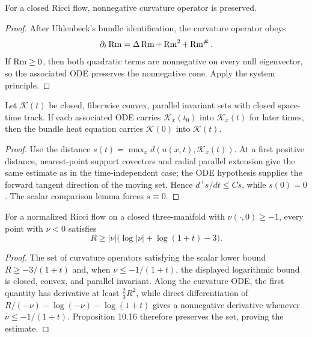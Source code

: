 \begin{theorem}
\label{thm:chow-ii-curvature-operator-preservation}
For a closed Ricci flow, nonnegative curvature operator is preserved.
\end{theorem}
\begin{proof}
After Uhlenbeck's bundle identification, the curvature operator obeys
\[
\partial_t\operatorname{Rm}=\Delta\operatorname{Rm}+\operatorname{Rm}^2+\operatorname{Rm}^\#.
\]
If $\operatorname{Rm}\ge0$, then both quadratic terms are nonnegative on every null
eigenvector, so the associated ODE preserves the nonnegative cone.  Apply the
system principle.
\end{proof}

\begin{theorem}
\label{thm:chow-ii-time-dependent-system-wmp}
Let $\mathcal K(t)$ be closed, fiberwise convex, parallel invariant sets with
closed space-time track.  If each associated ODE carries $\mathcal K_x(t_0)$ into
$\mathcal K_x(t)$ for later times, then the bundle heat equation carries
$\mathcal K(0)$ into $\mathcal K(t)$.
\end{theorem}
\begin{proof}
Use the distance $s(t)=\max_xd(u(x,t),\mathcal K_x(t))$.  At a first positive
distance, nearest-point support covectors and radial parallel extension give the
same estimate as in the time-independent case; the ODE hypothesis supplies the
forward tangent direction of the moving set.  Hence $d^+s/dt\le Cs$, while
$s(0)=0$.  The scalar comparison lemma forces $s\equiv0$.
\end{proof}

\begin{theorem}
\label{thm:chow-ii-hamilton-ivey}
For a normalized Ricci flow on a closed three-manifold with
$\nu(\cdot,0)\ge-1$, every point with $\nu<0$ satisfies
\[
R\ge|\nu|\bigl(\log|\nu|+\log(1+t)-3\bigr).
\]
\end{theorem}
\begin{proof}
The set of curvature operators satisfying the scalar lower bound
$R\ge-3/(1+t)$ and, when $\nu\le-1/(1+t)$, the displayed logarithmic bound is
closed, convex, and parallel invariant.  Along the curvature ODE, the first
quantity has derivative at least $\frac23R^2$, while direct differentiation of
\(R/(-\nu)-\log(-\nu)-\log(1+t)\) gives a nonnegative derivative whenever
$\nu\le-1/(1+t)$.  Proposition 10.16 therefore preserves the set, proving the
estimate.
\end{proof}


